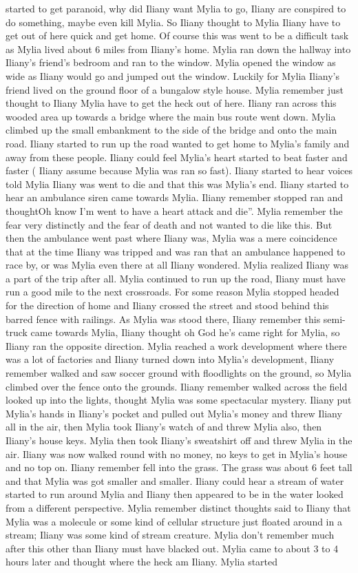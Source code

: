 \documentclass[12pt]{book}
\begin{document}
started to get paranoid, why did Iliany want Mylia to go, Iliany are conspired to do something, maybe even kill Mylia. So Iliany thought to Mylia Iliany have to get out of here quick and get home. Of course this was went to be a difficult task as Mylia lived about 6 miles from Iliany's home. Mylia ran down the hallway into Iliany's friend's bedroom and ran to the window. Mylia opened the window as wide as Iliany would go and jumped out the window. Luckily for Mylia Iliany's friend lived on the ground floor of a bungalow style house. Mylia remember just thought to Iliany Mylia have to get the heck out of here. Iliany ran across this wooded area up towards a bridge where the main bus route went down. Mylia climbed up the small embankment to the side of the bridge and onto the main road. Iliany started to run up the road wanted to get home to Mylia's family and away from these people. Iliany could feel Mylia's heart started to beat faster and faster ( Iliany assume because Mylia was ran so fast). Iliany started to hear voices told Mylia Iliany was went to die and that this was Mylia's end. Iliany started to hear an ambulance siren came towards Mylia. Iliany remember stopped ran and thoughtOh know I'm went to have a heart attack and die''. Mylia remember the fear very distinctly and the fear of death and not wanted to die like this. But then the ambulance went past where Iliany was, Mylia was a mere coincidence that at the time Iliany was tripped and was ran that an ambulance happened to race by, or was Mylia even there at all Iliany wondered. Mylia realized Iliany was a part of the trip after all. Mylia continued to run up the road, Iliany must have run a good mile to the next crossroads. For some reason Mylia stopped headed for the direction of home and Iliany crossed the street and stood behind this barred fence with railings. As Mylia was stood there, Iliany remember this semi-truck came towards Mylia, Iliany thought oh God he's came right for Mylia, so Iliany ran the opposite direction. Mylia reached a work development where there was a lot of factories and Iliany turned down into Mylia's development, Iliany remember walked and saw soccer ground with floodlights on the ground, so Mylia climbed over the fence onto the grounds. Iliany remember walked across the field looked up into the lights, thought Mylia was some spectacular mystery. Iliany put Mylia's hands in Iliany's pocket and pulled out Mylia's money and threw Iliany all in the air, then Mylia took Iliany's watch of and threw Mylia also, then Iliany's house keys. Mylia then took Iliany's sweatshirt off and threw Mylia in the air. Iliany was now walked round with no money, no keys to get in Mylia's house and no top on. Iliany remember fell into the grass. The grass was about 6 feet tall and that Mylia was got smaller and smaller. Iliany could hear a stream of water started to run around Mylia and Iliany then appeared to be in the water looked from a different perspective. Mylia remember distinct thoughts said to Iliany that Mylia was a molecule or some kind of cellular structure just floated around in a stream; Iliany was some kind of stream creature. Mylia don't remember much after this other than Iliany must have blacked out. Mylia came to about 3 to 4 hours later and thought where the heck am Iliany. Mylia started 
\end{document}

